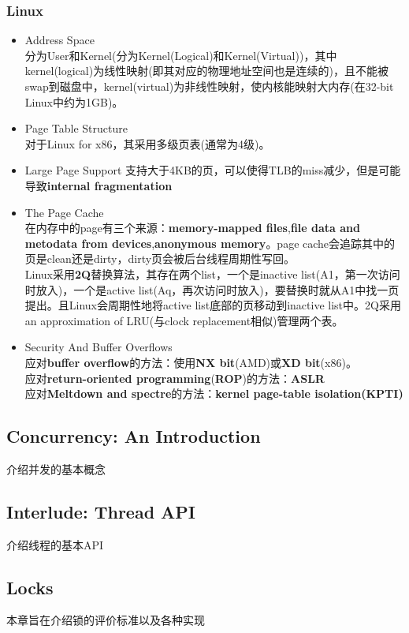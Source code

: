 \documentclass{article}
\begin{document}
\subsubsection{Linux}
\begin{itemize}
    \item Address Space \\
    分为User和Kernel(分为Kernel(Logical)和Kernel(Virtual))，其中kernel(logical)为线性映射(即其对应的物理地址空间也是连续的)，且不能被swap到磁盘中，kernel(virtual)为非线性映射，使内核能映射大内存(在32-bit Linux中约为1GB)。
    \item Page Table Structure \\
    对于Linux for x86，其采用多级页表(通常为4级)。
    \item Large Page Support
    支持大于4KB的页，可以使得TLB的miss减少，但是可能导致\textbf{internal fragmentation}
    \item The Page Cache \\
    在内存中的page有三个来源：\textbf{memory-mapped files},\textbf{file data and metodata from devices},\textbf{anonymous memory}。page cache会追踪其中的页是clean还是dirty，dirty页会被后台线程周期性写回。\\
    Linux采用\textbf{2Q}替换算法，其存在两个list，一个是inactive list(A1，第一次访问时放入)，一个是active list(Aq，再次访问时放入)，要替换时就从A1中找一页提出。且Linux会周期性地将active list底部的页移动到inactive list中。2Q采用an approximation of LRU(与clock replacement相似)管理两个表。
    \item Security And Buffer Overflows \\
    应对\textbf{buffer overflow}的方法：使用\textbf{NX bit}(AMD)或\textbf{XD bit}(x86)。\\
    应对\textbf{return-oriented programming}(\textbf{ROP})的方法：\textbf{ASLR} \\
    应对\textbf{Meltdown and spectre}的方法：\textbf{kernel page-table isolation(KPTI)}
\end{itemize}
\subsection{Concurrency: An Introduction}
介绍并发的基本概念
\subsection{Interlude: Thread API}
介绍线程的基本API
\subsection{Locks}
本章旨在介绍锁的评价标准以及各种实现
\end{document}
